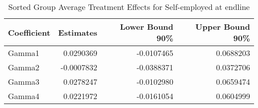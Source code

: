 \begin{table}

\caption{\label{tab:gatesQselfempl}Sorted Group Average Treatment Effects for Self-employed at endline}
\centering
\begin{tabular}[t]{lrrr}
\toprule
Coefficient & Estimates & Lower Bound 90\% & Upper Bound 90\%\\
\midrule
Gamma1 & 0.0290369 & -0.0107465 & 0.0688203\\
Gamma2 & -0.0007832 & -0.0388371 & 0.0372706\\
Gamma3 & 0.0278247 & -0.0102980 & 0.0659474\\
Gamma4 & 0.0221972 & -0.0161054 & 0.0604999\\
\bottomrule
\end{tabular}
\end{table}
